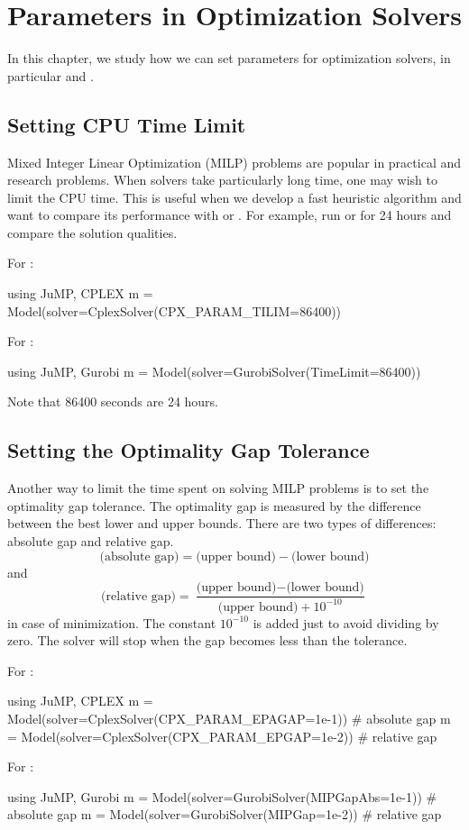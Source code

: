 \chapter{Parameters in Optimization Solvers}

In this chapter, we study how we can set parameters for optimization solvers, in particular \cplex{} and \gurobi{}.

\section{Setting CPU Time Limit}
Mixed Integer Linear Optimization (MILP) problems are popular in practical and research problems. When solvers take particularly long time, one may wish to limit the CPU time. This is useful when we develop a fast heuristic algorithm and want to compare its performance with \cplex{} or \gurobi{}. For example, run \cplex{} or \gurobi{} for 24 hours and compare the solution qualities.

\noindent For \cplex{}:
\begin{code}
using JuMP, CPLEX
m = Model(solver=CplexSolver(CPX_PARAM_TILIM=86400))
\end{code}
\noindent For \gurobi{}:
\begin{code}
using JuMP, Gurobi
m = Model(solver=GurobiSolver(TimeLimit=86400))
\end{code}

Note that 86400 seconds are 24 hours.

\section{Setting the Optimality Gap Tolerance}
Another way to limit the time spent on solving MILP problems is to set the optimality gap tolerance. The optimality gap is measured by the difference between the best lower and upper bounds. There are two types of differences: absolute gap and relative gap.
\[
	\text{(absolute gap)} = \text{(upper bound)} - \text{(lower bound)}
\]
and
\[
	\text{(relative gap)} = \frac{ \text{(upper bound)} - \text{(lower bound)} }{\text{(upper bound)} + 10^{-10}}
\]
in case of minimization. The constant $10^{-10}$ is added just to avoid dividing by zero. The solver will stop when the gap becomes less than the tolerance.

\noindent For \cplex{}:
\begin{code}
using JuMP, CPLEX
m = Model(solver=CplexSolver(CPX_PARAM_EPAGAP=1e-1)) # absolute gap
m = Model(solver=CplexSolver(CPX_PARAM_EPGAP=1e-2))  # relative gap
\end{code}
\noindent For \gurobi{}:
\begin{code}
using JuMP, Gurobi
m = Model(solver=GurobiSolver(MIPGapAbs=1e-1)) # absolute gap
m = Model(solver=GurobiSolver(MIPGap=1e-2))    # relative gap
\end{code}

